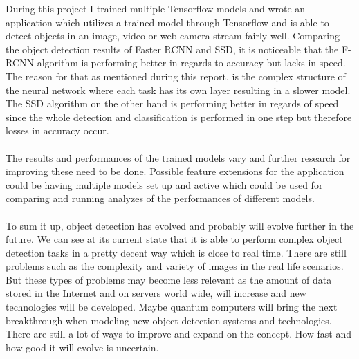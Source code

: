 
During this project I trained multiple Tensorflow models and wrote an application which utilizes a trained model through Tensorflow and is
able to detect objects in an image, video or web camera stream fairly well. Comparing the object detection results of Faster RCNN and SSD,
it is noticeable that the F-RCNN algorithm is performing better in regards to accuracy but lacks in speed. The reason for that as mentioned during this report, is the complex
structure of the neural network where each task has its own layer resulting in a slower model.\\ The SSD algorithm on the other hand is performing better
in regards of speed since the whole detection and classification is performed in one step but therefore losses in accuracy occur. \\ \\
The results and performances of the trained models vary and further
research for improving these need to be done. Possible feature extensions for the application could be having multiple models set up and
active which could be used for comparing and running analyzes of the performances of different models.\\\\
To sum it up, object detection has evolved and probably will evolve further in the future. We can see at its current state that it is able
to perform complex object detection tasks in a pretty decent way which is close to real time. There are still problems such as the
complexity and variety of images in the real life scenarios. But these types of problems may become less relevant as the amount
of data stored in the Internet and on servers world wide, will increase and new technologies will be developed. Maybe quantum computers
will bring the next breakthrough when modeling new object detection systems and technologies. There are still a lot of ways to improve and
expand on the concept. How fast and how good it will evolve is uncertain.


